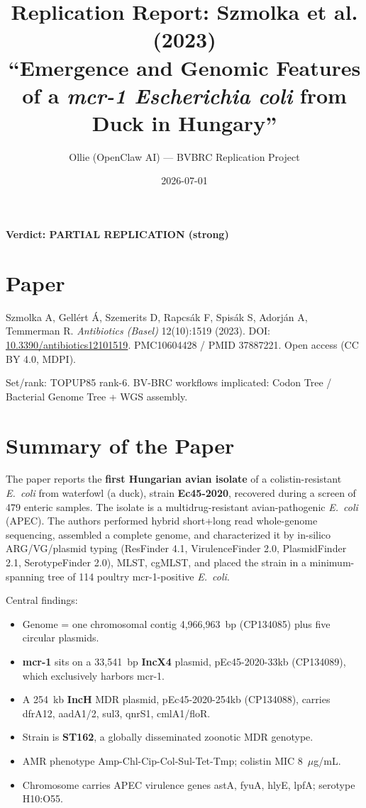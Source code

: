 \documentclass[11pt,letterpaper]{article}
\title{Replication Report: Szmolka et al. (2023) \\
\large ``Emergence and Genomic Features of a \emph{mcr-1 Escherichia coli} from Duck in Hungary''}
\author{Ollie (OpenClaw AI) --- BVBRC Replication Project}
\date{2026-07-01}
\begin{document}
\maketitle

\begin{center}
\textbf{Verdict: PARTIAL REPLICATION (strong)}
\end{center}

\section*{Paper}
Szmolka A, Gell\'ert \'A, Szemerits D, Rapcs\'ak F, Spis\'ak S, Adorj\'an A, Temmerman R.
\emph{Antibiotics (Basel)} 12(10):1519 (2023). DOI:
\href{https://doi.org/10.3390/antibiotics12101519}{10.3390/antibiotics12101519}.
PMC10604428 / PMID 37887221. Open access (CC BY 4.0, MDPI).

Set/rank: TOPUP85 rank-6. BV-BRC workflows implicated: Codon Tree / Bacterial
Genome Tree + WGS assembly.

\section{Summary of the Paper}
The paper reports the \textbf{first Hungarian avian isolate} of a colistin-resistant
\emph{E.\ coli} from waterfowl (a duck), strain \textbf{Ec45-2020}, recovered
during a screen of 479 enteric samples. The isolate is a multidrug-resistant
avian-pathogenic \emph{E.\ coli} (APEC). The authors performed hybrid short+long
read whole-genome sequencing, assembled a complete genome, and characterized it
by in-silico ARG/VG/plasmid typing (ResFinder 4.1, VirulenceFinder 2.0,
PlasmidFinder 2.1, SerotypeFinder 2.0), MLST, cgMLST, and placed the strain in a
minimum-spanning tree of 114 poultry mcr-1-positive \emph{E.\ coli}.

Central findings:
\begin{itemize}[leftmargin=1.5em]
  \item Genome = one chromosomal contig 4{,}966{,}963~bp (CP134085) plus five circular plasmids.
  \item \textbf{mcr-1} sits on a 33{,}541~bp \textbf{IncX4} plasmid, pEc45-2020-33kb (CP134089), which exclusively harbors mcr-1.
  \item A 254~kb \textbf{IncH} MDR plasmid, pEc45-2020-254kb (CP134088), carries dfrA12, aadA1/2, sul3, qnrS1, cmlA1/floR.
  \item Strain is \textbf{ST162}, a globally disseminated zoonotic MDR genotype.
  \item AMR phenotype Amp-Chl-Cip-Col-Sul-Tet-Tmp; colistin MIC 8~$\mu$g/mL.
  \item Chromosome carries APEC virulence genes astA, fyuA, hlyE, lpfA; serotype H10:O55.
\end{itemize}
\end{document}
